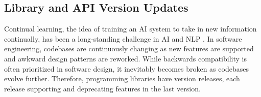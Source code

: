 





\vspace{-0.2cm}

\subsection{Library and API Version Updates} \label{sec:c-library-updates}

\vspace{-0.1cm}

Continual learning, the idea of training an AI system to take in new information continually, has been a long-standing challenge in AI and NLP  \citep{wu2024continual, wang2024comprehensive}. In software engineering, codebases are continuously changing as new features are supported and awkward design patterns are reworked. While backwards compatibility is often prioritized in software design, it inevitably becomes broken as codebases evolve further. Therefore, programming libraries have version releases, each release supporting and deprecating features in the last version. 

